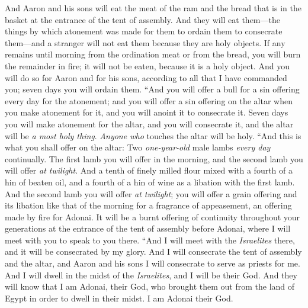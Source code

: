 \begin{biblechapter}
\verse And Aaron and his sons will eat the meat of the ram and the bread that is in the basket at the entrance of the tent of assembly.
\verse And they will eat them—the things by which atonement was made for them to ordain them to consecrate them—and a stranger will not eat them because they are holy objects.
\verse If any remains until morning from the ordination meat or from the bread, you will burn the remainder in fire; it will not be eaten, because it is a holy object.
\verse And you will do so for Aaron and for his sons, according to all that I have commanded you; seven days you will ordain them.
 “And you will offer a bull for a sin offering every day for the atonement; and you will offer a sin offering on the altar when you make atonement for it, and you will anoint it to consecrate it.
\verse Seven days you will make atonement for the altar, and you will consecrate it, and the altar will be \textit{a most holy thing}. \textit{Anyone who} touches the altar will be holy.
\verse “And this is what you shall offer on the altar: Two \textit{one-year-old} male lambs \textit{every day} continually.
\verse The first lamb you will offer in the morning, and the second lamb you will offer \textit{at twilight}.
\verse And a tenth of finely milled flour mixed with a fourth of a hin of beaten oil, and a fourth of a hin of wine as a libation with the first lamb.
\verse And the second lamb you will offer \textit{at twilight}; you will offer a grain offering and its libation like that of the morning for a fragrance of appeasement, an offering made by fire for Adonai.
\verse It will be a burnt offering of continuity throughout your generations at the entrance of the tent of assembly before Adonai, where I will meet with you to speak to you there.
\verse “And I will meet with the \textit{Israelites} there, and it will be consecrated by my glory.
\verse And I will consecrate the tent of assembly and the altar, and Aaron and his sons I will consecrate to serve as priests for me.
\verse And I will dwell in the midst of the \textit{Israelites}, and I will be their God.
\verse And they will know that I am Adonai, their God, who brought them out from the land of Egypt in order to dwell in their midst. I am Adonai their God.
\end{biblechapter}

